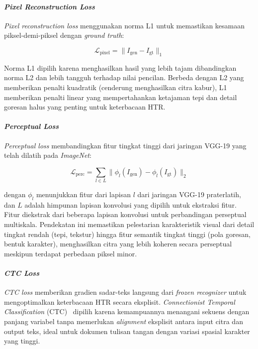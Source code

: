 \documentclass[12pt,a4paper]{article}
\begin{document}
\paragraph{\textit{Pixel Reconstruction Loss}}

\textit{Pixel reconstruction loss} menggunakan norma L1 untuk memastikan kesamaan piksel-demi-piksel dengan \textit{ground truth}:

\begin{equation}
  \mathcal{L}_{\text{pixel}} = \|I_{\text{gen}} - I_{\text{gt}}\|_1
  \label{eq:IV.15}
\end{equation}

Norma L1 dipilih karena menghasilkan hasil yang lebih tajam dibandingkan norma L2 dan lebih tangguh terhadap nilai pencilan. Berbeda dengan L2 yang memberikan penalti kuadratik (cenderung menghasilkan citra kabur), L1 memberikan penalti linear yang mempertahankan ketajaman tepi dan detail goresan halus yang penting untuk keterbacaan HTR.

\paragraph{\textit{Perceptual Loss}}

\textit{Perceptual loss} \parencite{johnson2016} membandingkan fitur tingkat tinggi dari jaringan VGG-19 yang telah dilatih pada \textit{ImageNet}:

\begin{equation}
  \mathcal{L}_{\text{perc}} = \sum_{l \in L} \|\phi_l(I_{\text{gen}}) - \phi_l(I_{\text{gt}})\|_2
  \label{eq:IV.16}
\end{equation}

dengan $\phi_l$ menunjukkan fitur dari lapisan $l$ dari jaringan VGG-19 praterlatih, dan $L$ adalah himpunan lapisan konvolusi yang dipilih untuk ekstraksi fitur. Fitur diekstrak dari beberapa lapisan konvolusi untuk perbandingan perseptual multiskala. Pendekatan ini memastikan pelestarian karakteristik visual dari detail tingkat rendah (tepi, tekstur) hingga fitur semantik tingkat tinggi (pola goresan, bentuk karakter), menghasilkan citra yang lebih koheren secara perseptual meskipun terdapat perbedaan piksel minor.

\paragraph{\textit{CTC Loss}}

\textit{CTC loss} memberikan gradien sadar-teks langsung dari \textit{frozen recognizer} untuk mengoptimalkan keterbacaan HTR secara eksplisit. \textit{Connectionist Temporal Classification} (CTC)~\parencite{graves2006} dipilih karena kemampuannya menangani sekuens dengan panjang variabel tanpa memerlukan \textit{alignment} eksplisit antara input citra dan output teks, ideal untuk dokumen tulisan tangan dengan variasi spasial karakter yang tinggi.
\end{document}
